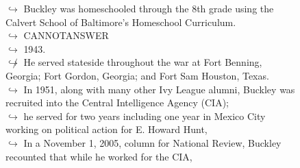 \documentclass[11pt,a4paper, onecolumn]{article}
\begin{document}
\begin{figure}[t] \small \begin{tcolorbox}[boxsep=0pt,left=5pt,right=0pt,top=2pt,colback = yellow!5] \begin{dialogue}
 \small 
\colorbox{pink!25}{$\hookrightarrow$}
{ Buckley was homeschooled through the 8th grade using the Calvert School of Baltimore's Homeschool Curriculum. }
\\
\colorbox{pink!25}{$\hookrightarrow$}
{ CANNOTANSWER }
\\
\colorbox{pink!25}{$\hookrightarrow$}
{ 1943. }
\\
\colorbox{pink!25}{$\not\hookrightarrow$}
{ He served stateside throughout the war at Fort Benning, Georgia; Fort Gordon, Georgia; and Fort Sam Houston, Texas. }
\\
\colorbox{pink!25}{$\hookrightarrow$}
{ In 1951, along with many other Ivy League alumni, Buckley was recruited into the Central Intelligence Agency (CIA); }
\\
\colorbox{pink!25}{$\hookrightarrow$}
{ he served for two years including one year in Mexico City working on political action for E. Howard Hunt, }
\\
\colorbox{pink!25}{$\hookrightarrow$}
{ In a November 1, 2005, column for National Review, Buckley recounted that while he worked for the CIA, }
\\
 \end{dialogue}\end{tcolorbox}\end{figure}
\end{document}
